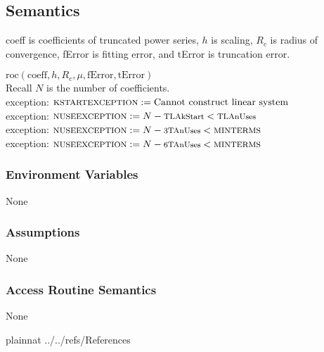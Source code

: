 \documentclass[12pt, titlepage]{article}
\begin{document}
\subsection{Semantics}

coeff is coefficients of truncated power series,
$h$ is scaling,
$R_c$ is radius of convergence,
fError is fitting error, and
tError is truncation error.

\vspace{.3cm}

\Ni $\text{roc}( \text{coeff}, h, R_c, \mu, \text{fError}, \text{tError})$\\

\Ni Recall $N$ is the number of coefficients.\\
\Ni exception: $\text{\footnotesize KSTARTEXCEPTION} := \text{Cannot construct linear system}$\\
\Ni exception: $\text{\footnotesize NUSEEXCEPTION} := N - \text{\footnotesize TLAkStart} < \text{\footnotesize TLAnUses}$\\
\Ni exception: $\text{\footnotesize NUSEEXCEPTION} := N - \text{\footnotesize 3TAnUses} < \text{\footnotesize MINTERMS}$\\
\Ni exception: $\text{\footnotesize NUSEEXCEPTION} := N - \text{\footnotesize 6TAnUses} < \text{\footnotesize MINTERMS}$\\

\subsubsection{Environment Variables}

None

\subsubsection{Assumptions}

None

\subsubsection{Access Routine Semantics}

None


\newpage

 {plainnat}
 {../../refs/References}
\end{document}
